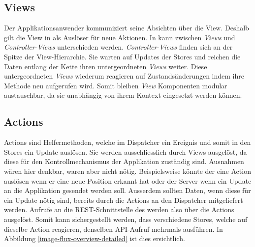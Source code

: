 \subsection{Views}
\label{pd-flux-views}
Der Applikationsanwender kommuniziert seine Absichten über die View.
Deshalb gilt die View in  als Auslöser für neue Aktionen.
In  kann zwischen \emph{Views} und \emph{Controller-Views} unterschieden werden.\newline
\emph{Controller-Views} finden sich an der Spitze der View-Hierarchie.
Sie warten auf Updates der Stores und reichen die Daten entlang der Kette ihren untergeordneten \emph{Views} weiter.\newline
Diese untergeordneten \emph{Views} wiederum reagieren auf Zustandsänderungen indem ihre \newline{} Methode neu aufgerufen wird.
Somit bleiben \emph{View} Komponenten modular austauschbar, da sie unabhängig von ihrem Kontext eingesetzt werden können.

\subsection{Actions}
\label{pd-flux-actions}
Actions sind Helfermethoden, welche im Dispatcher ein Ereignis und somit in den Stores ein Update auslösen.
Sie werden ausschliesslich durch Views ausgelöst, da diese für den Kontrollmechanismus der Applikation zuständig sind.
Ausnahmen wären hier denkbar, waren aber nicht nötig.
Beispielsweise könnte der  eine Action auslösen wenn er eine neue Position erkannt hat oder der Server wenn ein Update an die Applikation gesendet werden soll.\newline
Ausserdem sollten Daten, wenn diese für ein Update nötig sind, bereits durch die Actions an den Dispatcher mitgeliefert werden.
Aufrufe an die \gls{REST}-Schnittstelle des  werden also über die Actions ausgelöst.
Somit kann sichergestellt werden, dass verschiedene Stores, welche auf dieselbe Action reagieren, denselben \gls{API}-Aufruf mehrmals ausführen.
In Abbildung \ref{image-flux-overview-detailed} ist dies ersichtlich.

